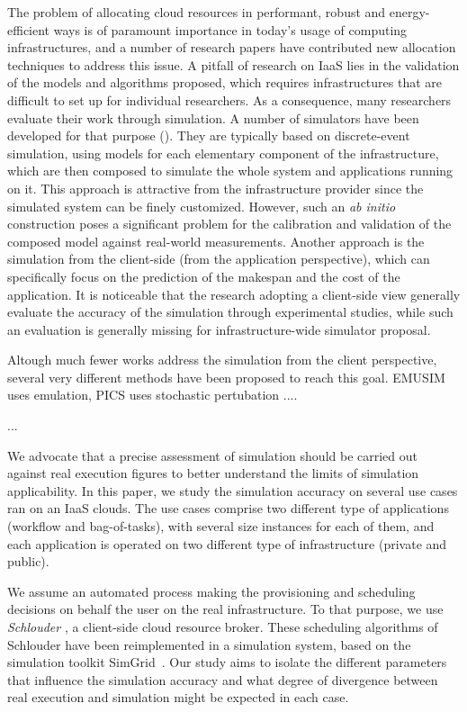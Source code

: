 



The  problem   of  allocating   cloud  resources   in  performant,   robust  and
energy-efficient ways is  of paramount importance in today's  usage of computing
infrastructures, and a number of research papers have contributed new allocation
techniques to  address this issue.   A pitfall of research  on IaaS lies  in the
validation of the models and algorithms proposed, which requires infrastructures
that are difficult to set up for individual researchers.  As a consequence, many
researchers evaluate their work through  simulation. A number of simulators have
been  developed for  that purpose  (\cite{9-14}).  They  are typically  based on
discrete-event simulation,  using models  for each  elementary component  of the
infrastructure,  which  are then  composed  to  simulate  the whole  system  and
applications running on it.  This approach is attractive from the infrastructure
provider since the simulated system can  be finely customized.  However, such an
\textit{ab initio} construction poses a  significant problem for the calibration
and validation of  the composed model against  real-world measurements.  Another
approach  is  the   simulation  from  the  client-side   (from  the  application
perspective), which can specifically focus on the prediction of the makespan and
the cost  of the  application.  It  is noticeable that  the research  adopting a
client-side  view generally  evaluate  the accuracy  of  the simulation  through
experimental  studies,  while  such  an  evaluation  is  generally  missing  for
infrastructure-wide simulator proposal. 

Altough much  fewer works  address the simulation  from the  client perspective,
several very  different methods have  been proposed  to reach this  goal. EMUSIM
\cite{CalheirosNRB13} uses emulation, PICS uses stochastic pertubation ....

...


We advocate  that a precise assessment  of simulation
should be  carried out against real  execution figures to better  understand the
limits  of simulation  applicability. In  this  paper, we  study the  simulation
accuracy on several use cases ran on  an IaaS clouds. The use cases comprise two
different type  of applications (workflow  and bag-of-tasks), with  several size
instances for  each of them, and  each application is operated  on two different
type of infrastructure (private and public).


We assume an automated process  making the provisioning and scheduling decisions
on  behalf  the user  on  the  real infrastructure.   To  that  purpose, we  use
\emph{Schlouder} \cite{}, a client-side cloud resource broker.  These scheduling
algorithms of Schlouder have been reimplemented in a simulation system, based on
the simulation toolkit SimGrid~\cite{simgrid08}.   Our study aims to isolate the
different parameters that  influence the simulation accuracy and  what degree of
divergence between real execution and simulation might be expected in each case.






